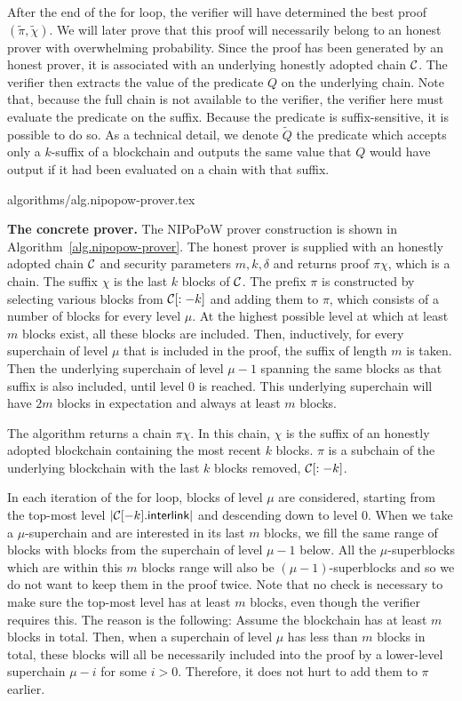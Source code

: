 After the end of the for loop, the verifier will have determined the best proof
$(\tilde\pi, \tilde\chi)$. We will later prove that this proof will necessarily
belong to an honest prover with overwhelming probability. Since the proof has
been generated by an honest prover, it is associated with an underlying honestly
adopted chain $\mathcal{C}$. The verifier then extracts the value of the predicate
$Q$ on the underlying chain. Note that, because the full chain is not available
to the verifier, the verifier here must evaluate the predicate on the suffix.
Because the predicate is suffix-sensitive, it is possible to do so. As a
technical detail, we denote $\tilde Q$ the predicate which accepts only a
$k$-suffix of a blockchain and outputs the same value that $Q$ would have output
if it had been evaluated on a chain with that suffix.

{algorithms/alg.nipopow-prover.tex}

\noindent
\textbf{The concrete prover.}
The NIPoPoW prover construction is shown in
Algorithm~\ref{alg.nipopow-prover}. The honest prover is supplied with an
honestly adopted chain $\mathcal{C}$ and security parameters $m, k, \delta$ and
returns proof $\pi\chi$, which is a chain. The suffix $\chi$ is the last $k$
blocks of $\mathcal{C}$. The prefix $\pi$ is constructed by selecting various blocks
from $\mathcal{C}[:-k]$ and adding them to $\pi$, which consists of a number of
blocks for every level $\mu$. At the highest possible level at which at least
$m$ blocks exist, all these blocks are included. Then, inductively, for every
superchain of level $\mu$ that is included in the proof, the suffix of length
$m$ is taken. Then the underlying superchain of level $\mu - 1$ spanning the
same blocks as that suffix is also included, until level $0$ is reached. This
underlying superchain will have $2m$ blocks in expectation and always at least
$m$ blocks.

The algorithm returns a chain $\pi\chi$. In this chain, $\chi$ is the suffix of
an honestly adopted blockchain containing the most recent $k$ blocks. $\pi$ is a
subchain of the underlying blockchain with the last $k$ blocks removed,
$\mathcal{C}[:-k]$.

In each iteration of the for loop, blocks of level $\mu$ are considered,
starting from the top-most level $|\mathcal{C}[-k].\textsf{interlink}|$ and
descending down to level $0$. When we take a $\mu$-superchain and are interested
in its last $m$ blocks, we fill the same range of blocks with blocks from the
superchain of level $\mu - 1$ below. All the $\mu$-superblocks which are within
this $m$ blocks range will also be $(\mu-1)$-superblocks and so we do not want
to keep them in the proof twice. Note that no check is necessary to make sure
the top-most level has at least $m$ blocks, even though the verifier requires
this. The reason is the following: Assume the blockchain has at least $m$ blocks
in total. Then, when a superchain of level $\mu$ has less than $m$ blocks in
total, these blocks will all be necessarily included into the proof by a
lower-level superchain $\mu - i$ for some $i > 0$. Therefore, it does not hurt
to add them to $\pi$ earlier.

